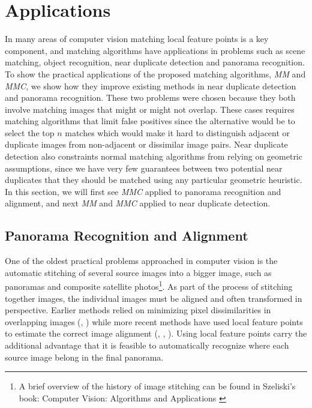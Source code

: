 \chapter{Applications}
\label{C:Applications}

In many areas of computer vision matching local feature points is a key 
component, and matching algorithms have applications in problems such as
scene matching, object recognition, near duplicate detection and 
panorama recognition. To show the practical applications of the proposed 
matching algorithms, \emph{MM} and \emph{MMC}, we show how they improve 
existing methods in near duplicate detection and panorama recognition. 
These two problems were chosen because they both involve matching images 
that might or might not overlap. These cases requires matching 
algorithms that limit false positives since the alternative would be to 
select the top $n$ matches which would make it hard to distinguish 
adjacent or duplicate images from non-adjacent or dissimilar
image pairs. Near duplicate detection also constraints normal matching 
algorithms from relying on geometric assumptions, since we have very few
guarantees between two potential near duplicates that they should be 
matched using any particular geometric heuristic. In this section, we 
will first see \emph{MMC} applied to panorama recognition and alignment,
and next \emph{MM} and \emph{MMC} applied to near duplicate detection.


\section{Panorama Recognition and Alignment}
One of the oldest practical problems approached in computer vision is 
the automatic stitching of several source images into a bigger image, 
such as panoramas and composite satellite photos\footnote{A brief 
overview of the history of image stitching can be found in Szeliski's 
book: Computer Vision: Algorithms and Applications \cite{szeliski2010}}.  
As part of the process of stitching together images, the individual 
images must be aligned and often transformed in perspective. Earlier 
methods relied on minimizing pixel dissimilarities in overlapping images
(\cite{shum1997panoramic}, \cite{szeliski1995direct}) while more recent 
methods have used local feature points to estimate the correct image 
alignment (\cite{mclauchlan2002image}, \cite{capel1998automated}, 
\cite{brown2007automatic}).  Using local feature points carry the 
additional advantage that it is feasible to automatically recognize 
where each source image belong in the final panorama.

